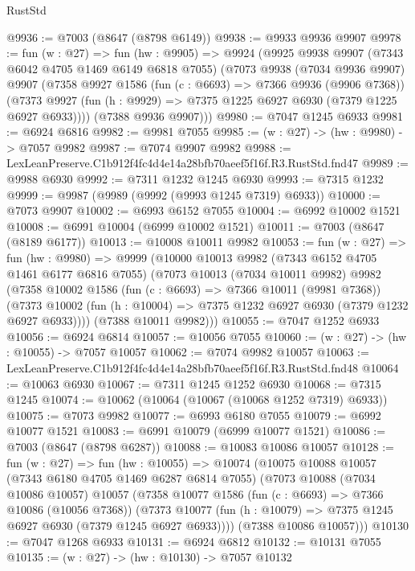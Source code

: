 \begin{lexlean}{RustStd}
\begin{coremodule}
@9936 := @7003 (@8647 (@8798 @6149))
@9938 := @9933 @9936 @9907
@9978 := fun (w : @27) =>
  fun (hw : @9905) =>
  @9924
    (@9925
      @9938
      @9907
      (@7343 @6042 @4705 @1469 @6149 @6818 @7055)
      (@7073
        @9938
        (@7034 @9936 @9907)
        @9907
        (@7358
          @9927
          @1586
          (fun (c : @6693) => @7366 @9936 (@9906 @7368))
          (@7373 @9927 (fun (h : @9929) => @7375 @1225 @6927 @6930 (@7379 @1225 @6927 @6933))))
        (@7388 @9936 @9907)))
@9980 := @7047 @1245 @6933
@9981 := @6924 @6816
@9982 := @9981 @7055
@9985 := (w : @27) -> (hw : @9980) -> @7057 @9982
@9987 := @7074 @9907 @9982
@9988 := LexLeanPreserve.C1b912f4fc4d4e14a28bfb70aeef5f16f.R3.RustStd.fnd47
@9989 := @9988 @6930
@9992 := @7311 @1232 @1245 @6930
@9993 := @7315 @1232
@9999 := @9987 (@9989 (@9992 (@9993 @1245 @7319) @6933))
@10000 := @7073 @9907
@10002 := @6993 @6152 @7055
@10004 := @6992 @10002 @1521
@10008 := @6991 @10004 (@6999 @10002 @1521)
@10011 := @7003 (@8647 (@8189 @6177))
@10013 := @10008 @10011 @9982
@10053 := fun (w : @27) =>
  fun (hw : @9980) =>
  @9999
    (@10000
      @10013
      @9982
      (@7343 @6152 @4705 @1461 @6177 @6816 @7055)
      (@7073
        @10013
        (@7034 @10011 @9982)
        @9982
        (@7358
          @10002
          @1586
          (fun (c : @6693) => @7366 @10011 (@9981 @7368))
          (@7373 @10002 (fun (h : @10004) => @7375 @1232 @6927 @6930 (@7379 @1232 @6927 @6933))))
        (@7388 @10011 @9982)))
@10055 := @7047 @1252 @6933
@10056 := @6924 @6814
@10057 := @10056 @7055
@10060 := (w : @27) -> (hw : @10055) -> @7057 @10057
@10062 := @7074 @9982 @10057
@10063 := LexLeanPreserve.C1b912f4fc4d4e14a28bfb70aeef5f16f.R3.RustStd.fnd48
@10064 := @10063 @6930
@10067 := @7311 @1245 @1252 @6930
@10068 := @7315 @1245
@10074 := @10062 (@10064 (@10067 (@10068 @1252 @7319) @6933))
@10075 := @7073 @9982
@10077 := @6993 @6180 @7055
@10079 := @6992 @10077 @1521
@10083 := @6991 @10079 (@6999 @10077 @1521)
@10086 := @7003 (@8647 (@8798 @6287))
@10088 := @10083 @10086 @10057
@10128 := fun (w : @27) =>
  fun (hw : @10055) =>
  @10074
    (@10075
      @10088
      @10057
      (@7343 @6180 @4705 @1469 @6287 @6814 @7055)
      (@7073
        @10088
        (@7034 @10086 @10057)
        @10057
        (@7358
          @10077
          @1586
          (fun (c : @6693) => @7366 @10086 (@10056 @7368))
          (@7373 @10077 (fun (h : @10079) => @7375 @1245 @6927 @6930 (@7379 @1245 @6927 @6933))))
        (@7388 @10086 @10057)))
@10130 := @7047 @1268 @6933
@10131 := @6924 @6812
@10132 := @10131 @7055
@10135 := (w : @27) -> (hw : @10130) -> @7057 @10132

\end{coremodule}
\end{lexlean}
